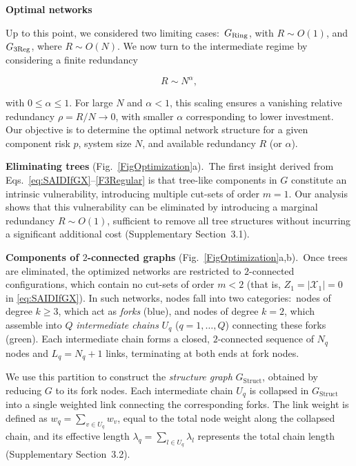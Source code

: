 \documentclass[oneside, a4paper, onecolumn, 11pt]{article}
\newcommand{\X}{\mathcal X}
\begin{document}
\begin{refsection}
\vspace{3mm}
\textbf{\Large \color{blue} Optimal networks}

Up to this point, we considered two limiting cases:\ $G_{\rm Ring}$, with $R \sim O(1)$, and $G_{3\rm Reg}$, where $R \sim O(N)$. We now turn to the intermediate regime by considering a finite redundancy

\begin{equation}
R \sim N^\alpha,
\label{Rho}
\end{equation}

with $0 \le \alpha \le 1$. For large $N$ and $\alpha < 1$, this scaling ensures a vanishing relative redundancy $\rho = R/N \to 0$, with smaller $\alpha$ corresponding to lower investment. Our objective is to determine the optimal network structure for a given component risk $p$, system size $N$, and available redundancy $R$ (or $\alpha$).

\vspace{3mm}
\textbf{\color{blue} Eliminating trees} (Fig.\ \ref{FigOptimization}a).\
The first insight derived from Eqs.\ \eqref{eq:SAIDIfGX}–\eqref{F3Regular} is that tree-like components in $G$ constitute an intrinsic vulnerability, introducing multiple cut-sets of order $m = 1$. Our analysis shows that this vulnerability can be eliminated by introducing a marginal redundancy $R \sim O(1)$, sufficient to remove all tree structures without incurring a significant additional cost (Supplementary Section~3.1).

\vspace{3mm}
\textbf{\color{blue} Components of $2$-connected graphs} (Fig.\ \ref{FigOptimization}a,b).\
Once trees are eliminated, the optimized networks are restricted to $2$-connected configurations, which contain no cut-sets of order $m < 2$ (that is, $Z_1 = |\X_1| = 0$ in \eqref{eq:SAIDIfGX}). In such networks, nodes fall into two categories:\ nodes of degree $k \ge 3$, which act as \textit{forks} (blue), and nodes of degree $k = 2$, which assemble into $Q$ \textit{intermediate chains} $U_q$ ($q = 1,\dots,Q$) connecting these forks (green). Each intermediate chain forms a closed, $2$-connected sequence of $N_q$ nodes and $L_q = N_q + 1$ links, terminating at both ends at fork nodes. 

We use this partition to construct the \textit{structure graph} $G_{\text{Struct}}$, obtained by reducing $G$ to its fork nodes. Each intermediate chain $U_q$ is collapsed in $G_{\text{Struct}}$ into a single weighted link connecting the corresponding forks. The link weight is defined as $w_q = \sum_{v \in U_q} w_v$, equal to the total node weight along the collapsed chain, and its effective length $\lambda_q = \sum_{l \in U_q} \lambda_l$ represents the total chain length (Supplementary Section~3.2).


\end{refsection}
\end{document}

